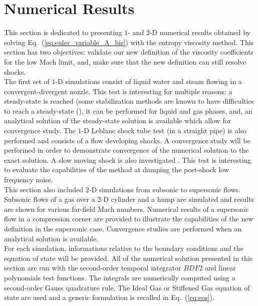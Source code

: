 \documentclass[preprint,10pt]{elsarticle}
\newcommand{\eqt}[1]{Eq.~(\ref{#1})}                     %
\begin{document}
\section{Numerical Results} \label{sec:results}
This section is dedicated to presenting $1$- and $2$-D numerical results obtained by solving \eqt{eq:euler_variable_A_bis} with the entropy viscosity method. This section has two objectives: validate our new definition of the viscosity coefficients for the low Mach limit, and, make sure that the new definition can still resolve shocks.\\
The first set of $1$-D simulations consist of liquid water and steam flowing in a convergent-divergent nozzle. This test is interesting for multiple reasons: a steady-state is reached (some stabilization methods are known to have difficulties to reach a steady-state (\cite{FluxLimiter, FluxLimiter2}), it can be performed for liquid and gas phases, and, an analytical solution of the steady-state solution is available which allow for convergence study. The $1$-D Leblanc shock tube test \cite{Leblanc} (in a straight pipe) is also performed and consists of a flow developing shocks. A convergence study will be performed in order to demonstrate convergence of the numerical solution to the exact solution. A slow moving shock is also investigated \cite{james}. This test is interesting to evaluate the capabilities of the method at damping the post-shock low frequency noise. \\ 
This section also included $2$-D simulations from subsonic to supersonic flows. Subsonic flows of a gas over a $2$-D cylinder and a hump \cite{Hump} are simulated and results are shown for various far-field Mach numbers. Numerical results of a supersonic flow in a compression corner are provided to illustrate the capabilities of the new definition in the supersonic case. Convergence studies are performed when an analytical solution is available. \\
For each simulation, informations relative to the boundary conditions and the equation of state will be provided. All of the numerical solution presented in this section are run with the second-order temporal integrator $BDF2$ and linear polynomials test functions. The integrals are numerically computed using a second-order Gauss quadrature rule. The Ideal Gas \cite{IGEOS} or Stiffened Gas equation of state \cite{SGEOS} are used and a generic formulation is recalled in \eqt{eq:eos}.
\end{document}
